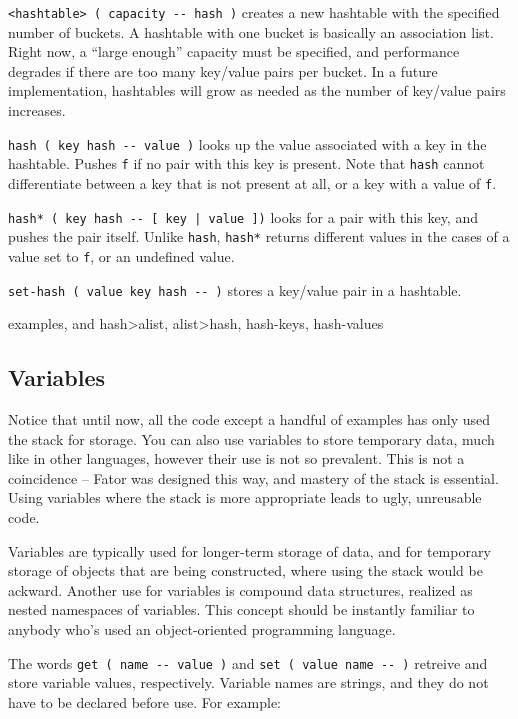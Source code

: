 \documentclass[english]{article}
\begin{document}
\texttt{<hashtable> ( capacity -{}- hash )} creates a new hashtable with the specified number of buckets. A hashtable with one bucket is basically an association list. Right now, a ``large enough'' capacity must be specified, and performance degrades if there are too many key/value pairs per bucket. In a future implementation, hashtables will grow as needed as the number of key/value pairs increases.

\texttt{hash ( key hash -{}- value )} looks up the value associated with a key in the hashtable. Pushes \texttt{f} if no pair with this key is present. Note that \texttt{hash} cannot differentiate between a key that is not present at all, or a key with a value of \texttt{f}.

\texttt{hash* ( key hash -{}- {[} key | value {]})} looks for
a pair with this key, and pushes the pair itself. Unlike \texttt{hash},
\texttt{hash{*}} returns different values in the cases of a value
set to \texttt{f}, or an undefined value.

\texttt{set-hash ( value key hash -{}- )} stores a key/value pair in a hashtable.

examples, and hash>alist, alist>hash, hash-keys, hash-values

\subsection{Variables}

Notice that until now, all the code except a handful of examples has only used the stack for storage. You can also use variables to store temporary data, much like in other languages, however their use is not so prevalent. This is not a coincidence -- Fator was designed this way, and mastery of the stack is essential. Using variables where the stack is more appropriate leads to ugly, unreusable code.

Variables are typically used for longer-term storage of data, and for temporary storage of objects that are being constructed, where using the stack would be ackward. Another use for variables is compound data structures, realized as nested namespaces of variables. This concept should be instantly familiar to anybody who's used an object-oriented programming language.

The words \texttt{get ( name -{}- value )} and \texttt{set ( value name -{}- )} retreive and store variable values, respectively. Variable names are strings, and they do not have to be declared before use. For example:
\end{document}

